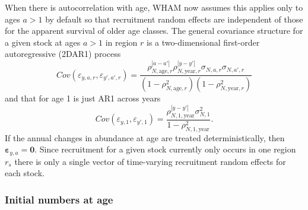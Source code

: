 \documentclass[
]{article}
\begin{document}
When there is autocorrelation with age, WHAM now assumes this applies only to ages \(a>1\) by default so that recruitment random effects are independent of those for the apparent survival of older age classes. The general covariance structure for a given stock at ages \(a>1\) in region \(r\) is a two-dimensional first-order autoregressive (2DAR1) process
\begin{equation*}
  Cov\left(\varepsilon_{y,a,r},\varepsilon_{y',a',r}\right) =   \frac{\rho_{N,\text{age},r}^{|a-a'|}\rho_{N,\text{year},r}^{|y-y'|}\sigma_{N,a,r}\sigma_{N,a',r}}{\left(1 -  \rho_{N,\text{age},r}^2\right)\left(1 - \rho_{N,\text{year},r}^2\right)} 
\end{equation*}
and that for age 1 is just AR1 across years
\begin{equation*}
  Cov\left(\varepsilon_{y,1},\varepsilon_{y',1}\right) =   \frac{\rho_{N,1,\text{year}}^{|y-y'|}\sigma^2_{N,1}}{1 - \rho_{N,1,\text{year}}^2}.
\end{equation*}
If the annual changes in abundance at age are treated deterministically, then \(\boldsymbol{\varepsilon}_{y,a} = \mathbf{0}\). Since recruitment for a given stock currently only occurs in one region \(r_s\) there is only a single vector of time-varying recruitment random effects for each stock.

\hypertarget{initial-numbers-at-age}{%
\subsubsection*{Initial numbers at age}\label{initial-numbers-at-age}}
\end{document}
